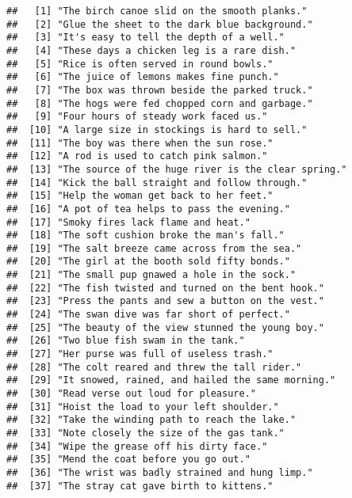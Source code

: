 \documentclass[
]{article}
\begin{document}
\begin{verbatim}
##   [1] "The birch canoe slid on the smooth planks."               
##   [2] "Glue the sheet to the dark blue background."              
##   [3] "It's easy to tell the depth of a well."                   
##   [4] "These days a chicken leg is a rare dish."                 
##   [5] "Rice is often served in round bowls."                     
##   [6] "The juice of lemons makes fine punch."                    
##   [7] "The box was thrown beside the parked truck."              
##   [8] "The hogs were fed chopped corn and garbage."              
##   [9] "Four hours of steady work faced us."                      
##  [10] "A large size in stockings is hard to sell."               
##  [11] "The boy was there when the sun rose."                     
##  [12] "A rod is used to catch pink salmon."                      
##  [13] "The source of the huge river is the clear spring."        
##  [14] "Kick the ball straight and follow through."               
##  [15] "Help the woman get back to her feet."                     
##  [16] "A pot of tea helps to pass the evening."                  
##  [17] "Smoky fires lack flame and heat."                         
##  [18] "The soft cushion broke the man's fall."                   
##  [19] "The salt breeze came across from the sea."                
##  [20] "The girl at the booth sold fifty bonds."                  
##  [21] "The small pup gnawed a hole in the sock."                 
##  [22] "The fish twisted and turned on the bent hook."            
##  [23] "Press the pants and sew a button on the vest."            
##  [24] "The swan dive was far short of perfect."                  
##  [25] "The beauty of the view stunned the young boy."            
##  [26] "Two blue fish swam in the tank."                          
##  [27] "Her purse was full of useless trash."                     
##  [28] "The colt reared and threw the tall rider."                
##  [29] "It snowed, rained, and hailed the same morning."          
##  [30] "Read verse out loud for pleasure."                        
##  [31] "Hoist the load to your left shoulder."                    
##  [32] "Take the winding path to reach the lake."                 
##  [33] "Note closely the size of the gas tank."                   
##  [34] "Wipe the grease off his dirty face."                      
##  [35] "Mend the coat before you go out."                         
##  [36] "The wrist was badly strained and hung limp."              
##  [37] "The stray cat gave birth to kittens."                     

\end{verbatim}
\end{document}
